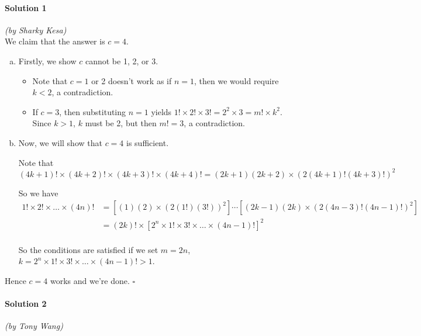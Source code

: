 \documentclass[10pt]{article}
\begin{document}
		\noindent \makebox[\linewidth]{\rule{\textwidth}{0.4pt}}	
	
	\paragraph{Solution 1} \textit{(by Sharky Kesa)}\\
	
	\noindent We claim that the answer is \(c = 4\).
	
	\begin{enumerate}[(a)]
	    \item Firstly, we show $c$ cannot be 1, 2, or 3.
	    \begin{itemize}
	        \item 	Note that $c=1$ or 2 doesn't work as if $n=1$, then we would require \(k < 2\), a contradiction.
	
	        \item If $c=3$, then substituting $n=1$ yields $1! \times 2! \times 3! = 2^2 \times 3 = m! \times k^2$. Since \(k > 1\), \(k\) must be 2, but then \(m! = 3\), a contradiction.
	    \end{itemize}
	    
	    \item Now, we will show that $c=4$ is sufficient.
	    
	    Note that 
    	$$(4k+1)! \times (4k+2)! \times (4k+3)! \times (4k+4)! = (2k+1)(2k+2) \times (2 (4k+1)! (4k+3)!)^2$$
    	
    	So we have
    	$$\begin{aligned}
    	1! \times 2! \times \dots \times (4n)! &= \left[(1)(2) \times (2 (1!) (3!))^2\right] \cdots  \left[(2k-1) (2k) \times (2(4n-3)!(4n-1)!)^2\right]\\
    	&= (2k)! \times [2^n \times 1! \times 3! \times \dots \times (4n-1)!]^2\\
    	\end{aligned}$$
    	
    	So the conditions are satisfied if we set $m=2n$, $k=2^n \times 1! \times 3! \times \dots \times (4n-1)! > 1$.
	    
	\end{enumerate}
	
	\noindent Hence \(c = 4\) works and we're done. \hfill\ensuremath{\square}\\
	
		\noindent \makebox[\linewidth]{\rule{\textwidth}{0.4pt}}
	
	\paragraph{Solution 2} \textit{(by Tony Wang)}\\
	
\end{document}
